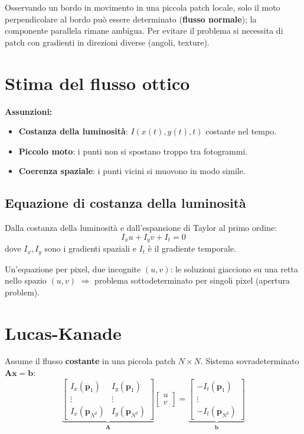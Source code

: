 \documentclass[12pt, a4paper]{report}
\begin{document}
Osservando un bordo in movimento in una piccola patch locale, solo il moto
perpendicolare al bordo può essere determinato (\textbf{flusso normale}); la
componente parallela rimane ambigua. Per evitare il problema si necessita di
patch con gradienti in direzioni diverse (angoli, texture).

\section{Stima del flusso ottico}

\textbf{Assunzioni:}
\begin{itemize}
  \item \textbf{Costanza della luminosità}: $I(x(t),y(t),t)$ costante nel tempo.
  \item \textbf{Piccolo moto}: i punti non si spostano troppo tra fotogrammi.
  \item \textbf{Coerenza spaziale}: i punti vicini si muovono in modo simile.
\end{itemize}

\subsection{Equazione di costanza della luminosità}

Dalla costanza della luminosità e dall'espansione di Taylor al primo ordine:
\[
  I_x u + I_y v + I_t = 0
\]
dove $I_x,I_y$ sono i gradienti spaziali e $I_t$ è il gradiente temporale.

\begin{warnbox}
Un'equazione per pixel, due incognite $(u,v)$: le soluzioni giacciono su una
retta nello spazio $(u,v)$ $\Rightarrow$ problema sottodeterminato per singoli
pixel (apertura problem).
\end{warnbox}

\section{Lucas-Kanade}

Assume il flusso \textbf{costante} in una piccola patch $N\times N$.
Sistema sovradeterminato $\mathbf{Ax}=\mathbf{b}$:
\[
  \underbrace{\begin{bmatrix}I_x(\mathbf{p}_1)&I_y(\mathbf{p}_1)\\\vdots&\vdots\\I_x(\mathbf{p}_{N^2})&I_y(\mathbf{p}_{N^2})\end{bmatrix}}_{\mathbf{A}}
  \begin{bmatrix}u\\v\end{bmatrix}=
  \underbrace{\begin{bmatrix}-I_t(\mathbf{p}_1)\\\vdots\\-I_t(\mathbf{p}_{N^2})\end{bmatrix}}_{\mathbf{b}}
\]
\end{document}
